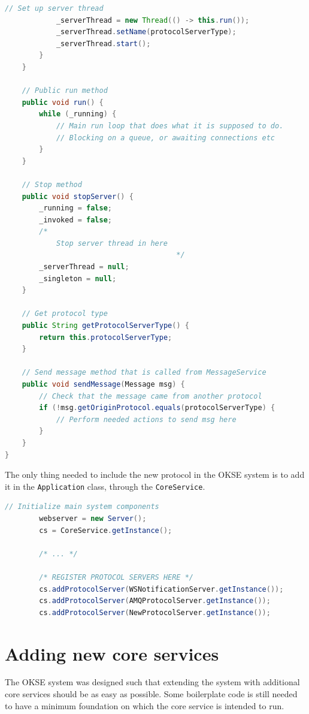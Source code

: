 \begin{lstlisting}[language=Java, captionpos=b, caption=Adding a new protocol, frame=bt, showstringspaces=false]
            // Set up server thread
            _serverThread = new Thread(() -> this.run());
            _serverThread.setName(protocolServerType);
            _serverThread.start();
        }
    }
    
    // Public run method
    public void run() {
        while (_running) {
            // Main run loop that does what it is supposed to do.
            // Blocking on a queue, or awaiting connections etc
        }
    }
    
    // Stop method
    public void stopServer() {
        _running = false;
        _invoked = false;
        /*
            Stop server thread in here
                                        */
        _serverThread = null;
        _singleton = null;
    }
    
    // Get protocol type
    public String getProtocolServerType() {
        return this.protocolServerType;
    }
    
    // Send message method that is called from MessageService
    public void sendMessage(Message msg) {
        // Check that the message came from another protocol
        if (!msg.getOriginProtocol.equals(protocolServerType) {
            // Perform needed actions to send msg here
        }
    }
}
\end{lstlisting}

The only thing needed to include the new protocol in the OKSE system is to add it in the \verb!Application! class, through the \verb!CoreService!.

\begin{lstlisting}[language=Java, captionpos=b, caption=Registering a new protocol, frame=bt, showstringspaces=false]
        // Initialize main system components
        webserver = new Server();
        cs = CoreService.getInstance();

        /* ... */

        /* REGISTER PROTOCOL SERVERS HERE */
        cs.addProtocolServer(WSNotificationServer.getInstance());
        cs.addProtocolServer(AMQProtocolServer.getInstance());
        cs.addProtocolServer(NewProtocolServer.getInstance());
\end{lstlisting}

\section{Adding new core services}
\label{sec:adding-new-core-services}

The OKSE system was designed such that extending the system with additional core services should be as easy as possible. Some boilerplate code is still needed to have a minimum foundation on which the core service is intended to run.

